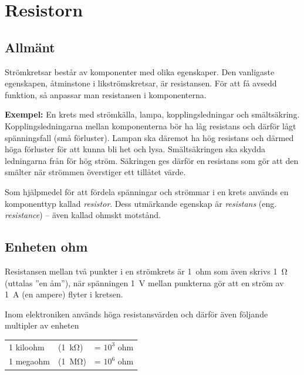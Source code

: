 \section{Resistorn}
\label{sec:resistorn}

\subsection{Allmänt}

Strömkretsar består av komponenter med olika egenskaper.
Den vanligaste egenskapen, åtminstone i likströmskretsar, är resistansen.
För att få avsedd funktion, så anpassar man resistansen i komponenterna.

\textbf{Exempel:} En krets med strömkälla, lampa, kopplingsledningar och smältsäkring.
Kopplingsledningarna mellan komponenterna bör ha låg resistans och därför lågt
spänningsfall (små förluster).
Lampan ska däremot ha hög resistans och därmed höga förluster för att kunna bli
het och lysa.
Smältsäkringen ska skydda ledningarna från för hög ström.
Säkringen ges därför en resistans som gör att den smälter när strömmen
överstiger ett tillåtet värde.

Som hjälpmedel för att fördela spänningar och strömmar i en krets används
en komponenttyp kallad \emph{resistor}.
Dess utmärkande egenskap är \emph{resistans} (eng. \emph{resistance}) --
även kallad ohmskt motstånd.

\subsection{Enheten ohm}
\label{enheten_ohm}


Resistansen mellan två punkter i en strömkrets är 1~ohm som även skrivs
\qty{1}{\ohm} (uttalas ''en åm''), när spänningen \qty{1}{\volt} mellan
punkterna gör att en ström av \qty{1}{\ampere} (en ampere) flyter i kretsen.

Inom elektroniken används höga resistansvärden och därför även följande
multipler av enheten

\begin{center}
\begin{tabular}{lll}
  1 kiloohm & (\qty{1}{\kilo\ohm}) & = \(10^3\) ohm \\
  1 megaohm & (\qty{1}{\mega\ohm}) & = \(10^6\) ohm \\
\end{tabular}
\end{center}

